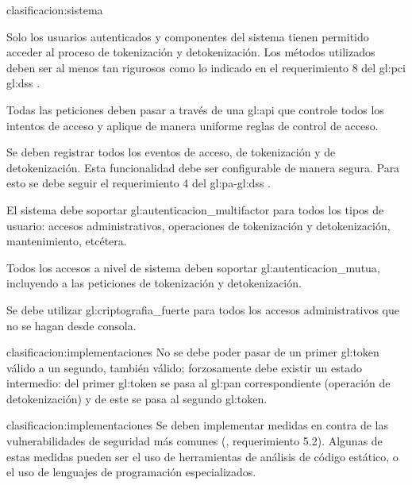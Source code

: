 {clasificacion:sistema}
{
  Solo los usuarios autenticados y componentes del sistema tienen permitido
  acceder al proceso de tokenización y detokenización. Los métodos utilizados
  deben ser al menos tan rigurosos como lo indicado en el requerimiento 8 del
  \gls{gl:pci} \gls{gl:dss} \cite{pci_dss}.

  {
    Todas las peticiones deben pasar a través de una \gls{gl:api} que controle
    todos los intentos de acceso y aplique de manera uniforme reglas de
    control de acceso.
  }

  {
    Se deben registrar todos los eventos de acceso, de tokenización y
    de detokenización. Esta funcionalidad debe ser configurable de manera
    segura. Para esto se debe seguir el requerimiento 4 del
    \gls{gl:pa}-\gls{gl:dss} \cite{dss_pa}.
  }

  {
    El sistema debe soportar \gls{gl:autenticacion_multifactor} para todos
    los tipos de usuario: accesos administrativos, operaciones de tokenización
    y detokenización, mantenimiento, etcétera.
  }

  {
    Todos los accesos a nivel de sistema deben soportar
    \gls{gl:autenticacion_mutua}, incluyendo a las peticiones de tokenización
    y detokenización.
  }

  {
    Se debe utilizar \gls{gl:criptografia_fuerte} para todos los accesos
    administrativos que no se hagan desde consola.
  }
}

{clasificacion:implementaciones}
{
  No se debe poder pasar de un primer \gls{gl:token} válido a un segundo,
  también válido; forzosamente debe existir un estado intermedio: del primer
  \gls{gl:token} se pasa al \gls{gl:pan} correspondiente (operación de
  detokenización) y de este se pasa al segundo \gls{gl:token}.
}

{clasificacion:implementaciones}
{
  Se deben implementar medidas en contra de las vulnerabilidades de
  seguridad más comunes (\cite{dss_pa}, requerimiento 5.2). Algunas de estas
  medidas pueden ser el uso de herramientas de análisis de código estático,
  o el uso de lenguajes de programación especializados.
}

